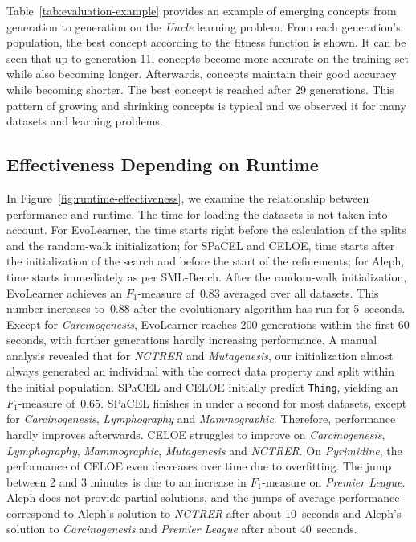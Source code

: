 

Table~\ref{tab:evaluation-example} provides an example of emerging concepts from generation to generation on the \textit{Uncle} learning problem. From each generation's population, the best concept according to the fitness function is shown. It can be seen that up to generation 11, concepts become more accurate on the training set while also becoming longer. Afterwards, concepts maintain their good accuracy while becoming shorter. The best concept is reached after 29 generations. This pattern of growing and shrinking concepts is typical and we observed it for many datasets and learning problems.



\subsection{Effectiveness Depending on Runtime}%
\label{subsec:effectiveness-over-runtime}

In Figure~\ref{fig:runtime-effectiveness}, we examine the relationship between performance and runtime. The time for loading the datasets is not taken into account. For EvoLearner, the time starts right before the calculation of the splits and the random-walk initialization; for SPaCEL and CELOE, time starts after the initialization of the search and before the start of the refinements; for Aleph, time starts immediately as per SML-Bench. After the random-walk initialization, EvoLearner achieves an $F_1$-measure of~0.83 averaged over all datasets. This number increases to~0.88 after the evolutionary algorithm has run for 5~seconds. Except for \textit{Carcinogenesis}, EvoLearner reaches 200 generations within the first 60 seconds, with further generations hardly increasing performance. A manual analysis revealed that for \textit{NCTRER} and \textit{Mutagenesis}, our initialization almost always generated an individual with the correct data property and split within the initial population. SPaCEL and CELOE initially predict \texttt{Thing}, yielding an $F_1$-measure of~0.65. SPaCEL finishes in under a second for most datasets, except for \textit{Carcinogenesis}, \textit{Lymphography} and \textit{Mammographic}. Therefore, performance hardly improves afterwards. CELOE struggles to improve on \textit{Carcinogenesis}, \textit{Lymphography}, \textit{Mammographic}, \textit{Mutagenesis} and \textit{NCTRER}. On \textit{Pyrimidine}, the performance of CELOE even decreases over time due to overfitting. The jump between 2 and 3 minutes is due to an increase in $F_1$-measure on \textit{Premier League}. Aleph does not provide partial solutions, and the jumps of average performance correspond to Aleph's solution to \textit{NCTRER} after about 10~seconds and Aleph's solution to \textit{Carcinogenesis} and \textit{Premier League} after about 40~seconds.
